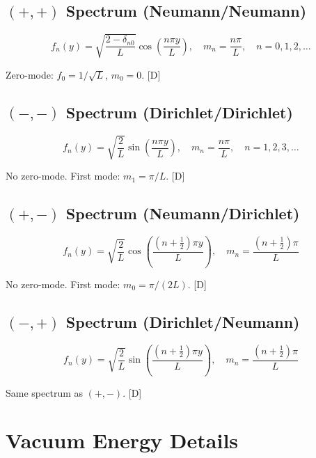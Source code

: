 \documentclass[11pt,a4paper]{article}
\newcommand{\tagD}{\textcolor{blue!70!black}{[D]}}
\begin{document}
\subsection{$(+,+)$ Spectrum (Neumann/Neumann)}

\begin{equation}
\label{eq:app-NN}
f_n(y) = \sqrt{\frac{2 - \delta_{n0}}{L}} \cos\left(\frac{n\pi y}{L}\right), \quad
m_n = \frac{n\pi}{L}, \quad n = 0, 1, 2, \ldots
\end{equation}

Zero-mode: $f_0 = 1/\sqrt{L}$, $m_0 = 0$. \tagD

\subsection{$(-,-)$ Spectrum (Dirichlet/Dirichlet)}

\begin{equation}
\label{eq:app-DD}
f_n(y) = \sqrt{\frac{2}{L}} \sin\left(\frac{n\pi y}{L}\right), \quad
m_n = \frac{n\pi}{L}, \quad n = 1, 2, 3, \ldots
\end{equation}

No zero-mode. First mode: $m_1 = \pi/L$. \tagD

\subsection{$(+,-)$ Spectrum (Neumann/Dirichlet)}

\begin{equation}
\label{eq:app-ND}
f_n(y) = \sqrt{\frac{2}{L}} \cos\left(\frac{(n + \tfrac{1}{2})\pi y}{L}\right), \quad
m_n = \frac{(n + \tfrac{1}{2})\pi}{L}
\end{equation}

No zero-mode. First mode: $m_0 = \pi/(2L)$. \tagD

\subsection{$(-,+)$ Spectrum (Dirichlet/Neumann)}

\begin{equation}
\label{eq:app-DN}
f_n(y) = \sqrt{\frac{2}{L}} \sin\left(\frac{(n + \tfrac{1}{2})\pi y}{L}\right), \quad
m_n = \frac{(n + \tfrac{1}{2})\pi}{L}
\end{equation}

Same spectrum as $(+,-)$. \tagD

\section{Vacuum Energy Details}
\label{app:vacuum}
\end{document}
